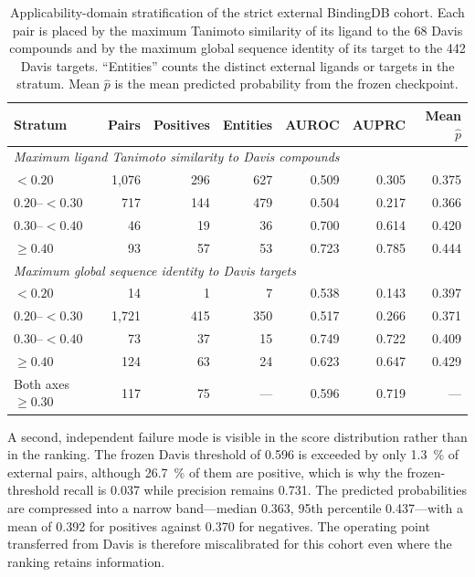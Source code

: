 \documentclass[fleqn,10pt]{wlscirep}
\begin{document}
\begin{table}[htbp]
\centering
\small
\caption{Applicability-domain stratification of the strict external BindingDB
  cohort. Each pair is placed by the maximum Tanimoto similarity of its ligand
  to the 68 Davis compounds and by the maximum global sequence identity of its
  target to the 442 Davis targets. ``Entities'' counts the distinct external
  ligands or targets in the stratum. Mean $\hat{p}$ is the mean predicted
  probability from the frozen checkpoint.}
\label{tab:applicability}
\begin{tabular}{lrrrrrr}
\toprule
\textbf{Stratum} & \textbf{Pairs} & \textbf{Positives} & \textbf{Entities} &
\textbf{AUROC} & \textbf{AUPRC} & \textbf{Mean $\hat{p}$} \\
\midrule
\multicolumn{7}{l}{\emph{Maximum ligand Tanimoto similarity to Davis compounds}} \\
$<0.20$          & 1{,}076 & 296 & 627 & 0.509 & 0.305 & 0.375 \\
$0.20$--$<0.30$  &    717 & 144 & 479 & 0.504 & 0.217 & 0.366 \\
$0.30$--$<0.40$  &     46 &  19 &  36 & 0.700 & 0.614 & 0.420 \\
$\geq 0.40$      &     93 &  57 &  53 & 0.723 & 0.785 & 0.444 \\
\midrule
\multicolumn{7}{l}{\emph{Maximum global sequence identity to Davis targets}} \\
$<0.20$          &     14 &   1 &   7 & 0.538 & 0.143 & 0.397 \\
$0.20$--$<0.30$  & 1{,}721 & 415 & 350 & 0.517 & 0.266 & 0.371 \\
$0.30$--$<0.40$  &     73 &  37 &  15 & 0.749 & 0.722 & 0.409 \\
$\geq 0.40$      &    124 &  63 &  24 & 0.623 & 0.647 & 0.429 \\
\midrule
Both axes $\geq 0.30$ & 117 & 75 & --- & 0.596 & 0.719 & --- \\
\bottomrule
\end{tabular}
\end{table}

A second, independent failure mode is visible in the score distribution rather
than in the ranking.  The frozen Davis threshold of 0.596 is exceeded by only
\SI{1.3}{\percent} of external pairs, although \SI{26.7}{\percent} of them are
positive, which is why the frozen-threshold recall is 0.037 while precision
remains 0.731.  The predicted probabilities are compressed into a narrow
band---median 0.363, 95th percentile 0.437---with a mean of 0.392 for positives
against 0.370 for negatives.  The operating point transferred from Davis is
therefore miscalibrated for this cohort even where the ranking retains
information.
\end{document}
